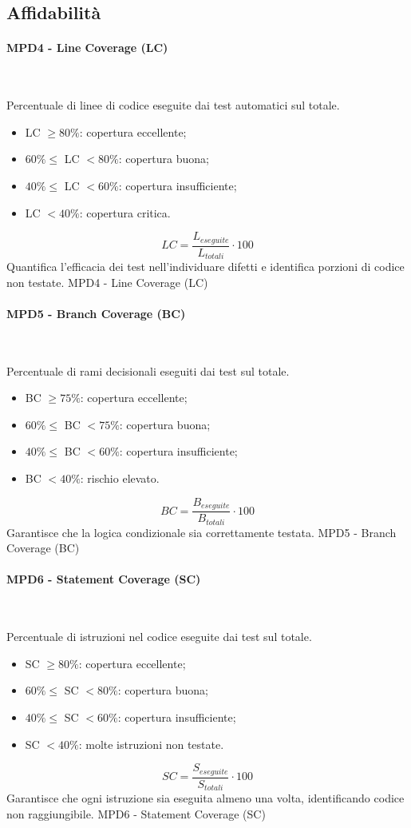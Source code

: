 \documentclass[10pt, letterpaper]{article}
\newcommand{\trisubsection}[1]{\paragraph{#1}\mbox{}\\}
\begin{document}
\subsection{Affidabilità}
\trisubsection{MPD4 - Line Coverage (LC)}
{Percentuale di linee di codice eseguite dai test automatici sul totale.
    \begin{itemize}
        \item LC $\geq 80\%$: copertura eccellente;
        \item $60\% \leq$ LC $< 80\%$: copertura buona;
        \item $40\% \leq$ LC $< 60\%$: copertura insufficiente;
        \item LC $< 40\%$: copertura critica.
    \end{itemize}}
{\[ LC = \frac{L_{eseguite}}{L_{totali}} \cdot 100 \]}
{Quantifica l'efficacia dei test nell'individuare difetti e identifica porzioni di codice non testate.}
{MPD4 - Line Coverage (LC)}

\trisubsection{MPD5 - Branch Coverage (BC)}
{Percentuale di rami decisionali eseguiti dai test sul totale.
    \begin{itemize}
        \item BC $\geq 75\%$: copertura eccellente;
        \item $60\% \leq$ BC $< 75\%$: copertura buona;
        \item $40\% \leq$ BC $< 60\%$: copertura insufficiente;
        \item BC $< 40\%$: rischio elevato.
    \end{itemize}}
{\[ BC = \frac{B_{eseguite}}{B_{totali}} \cdot 100 \]}
{Garantisce che la logica condizionale sia correttamente testata.}
{MPD5 - Branch Coverage (BC)}

\trisubsection{MPD6 - Statement Coverage (SC)}
{Percentuale di istruzioni nel codice eseguite dai test sul totale.
    \begin{itemize}
        \item SC $\geq 80\%$: copertura eccellente;
        \item $60\% \leq$ SC $< 80\%$: copertura buona;
        \item $40\% \leq$ SC $< 60\%$: copertura insufficiente;
        \item SC $< 40\%$: molte istruzioni non testate.
    \end{itemize}}
{\[ SC = \frac{S_{eseguite}}{S_{totali}} \cdot 100 \]}
{Garantisce che ogni istruzione sia eseguita almeno una volta, identificando codice non raggiungibile.}
{MPD6 - Statement Coverage (SC)}
\end{document}
